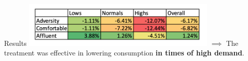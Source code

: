 \documentclass{beamer}
\begin{document}
\begin{frame}{Results}
  \centering
  \includegraphics[width=0.7\textwidth]{images/lin-reg-per-socio-results.png}
  \newline
  $\implies$ The treatment was effective in lowering consumption \textbf{in times of high demand}.
\end{frame}



\end{document}
